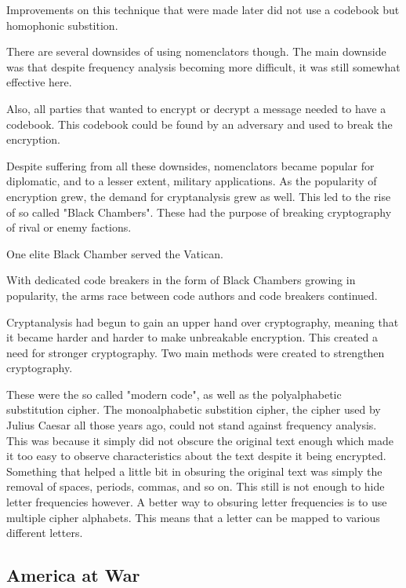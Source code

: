 \documentclass{article}
\begin{document}
    Improvements on this technique that were made later did not use a codebook
    but homophonic substition.

    There are several downsides of using nomenclators though. The main
    downside was that despite frequency analysis becoming more difficult,
    it was still somewhat effective here.
    
    Also, all parties that wanted to encrypt or decrypt a message needed
    to have a codebook. This codebook could be found by an adversary and
    used to break the encryption.

    Despite suffering from all these downsides, nomenclators became popular
    for diplomatic, and to a lesser extent, military applications.
    As the popularity of encryption grew, the demand for cryptanalysis grew
    as well.
    This led to the rise of so called "Black Chambers". These had the purpose
    of breaking cryptography of rival or enemy factions.

    One elite Black Chamber served the Vatican.

    With dedicated code breakers in the form of Black Chambers
    growing in popularity, the arms race
    between code authors and code breakers continued.

    Cryptanalysis had begun to gain an upper hand over cryptography,
    meaning that it became harder and harder to make unbreakable
    encryption.
    This created a need for stronger cryptography.
    Two main methods were created to strengthen cryptography.

    These were the so called "modern code", as well as the polyalphabetic substitution
    cipher.
    The monoalphabetic substition cipher, the cipher used by Julius Caesar all those
    years ago, could not stand against frequency analysis. This was
    because it simply did not obscure the original text enough
    which made it too easy to observe characteristics about the text
    despite it being encrypted. Something that helped a little bit
    in obsuring the original text was simply the removal of spaces, periods, commas,
    and so on.
    This still is not enough to hide letter frequencies however.
    A better way to obsuring letter frequencies is to use multiple cipher alphabets.
    This means that a letter can be mapped to various different letters.

    \subsection{America at War} 
\end{document}

